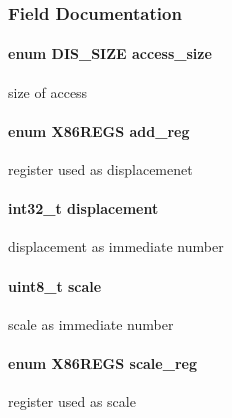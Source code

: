 \subsubsection{Field Documentation}
\hypertarget{struct_d_i_s__mem__arg_abe85ed51a3596cdb3a868a284c3d961f}{
\paragraph[{access\_\-size}]{\setlength{\rightskip}{0pt plus 5cm}enum {\bf DIS\_\-SIZE} {\bf access\_\-size}}\hfill}
\label{struct_d_i_s__mem__arg_abe85ed51a3596cdb3a868a284c3d961f}
size of access \hypertarget{struct_d_i_s__mem__arg_abdbd08c3d265ff494ad5ff1006cc6a73}{
\paragraph[{add\_\-reg}]{\setlength{\rightskip}{0pt plus 5cm}enum {\bf X86REGS} {\bf add\_\-reg}}\hfill}
\label{struct_d_i_s__mem__arg_abdbd08c3d265ff494ad5ff1006cc6a73}
register used as displacemenet \hypertarget{struct_d_i_s__mem__arg_a241d2c58aca95f8589148d4acf97406d}{
\paragraph[{displacement}]{\setlength{\rightskip}{0pt plus 5cm}int32\_\-t {\bf displacement}}\hfill}
\label{struct_d_i_s__mem__arg_a241d2c58aca95f8589148d4acf97406d}
displacement as immediate number \hypertarget{struct_d_i_s__mem__arg_a616c0a72f0e4af38b93c736773ac7210}{
\paragraph[{scale}]{\setlength{\rightskip}{0pt plus 5cm}uint8\_\-t {\bf scale}}\hfill}
\label{struct_d_i_s__mem__arg_a616c0a72f0e4af38b93c736773ac7210}
scale as immediate number \hypertarget{struct_d_i_s__mem__arg_afb3d2d6aee6f877fd62b8ffc576d9351}{
\paragraph[{scale\_\-reg}]{\setlength{\rightskip}{0pt plus 5cm}enum {\bf X86REGS} {\bf scale\_\-reg}}\hfill}
\label{struct_d_i_s__mem__arg_afb3d2d6aee6f877fd62b8ffc576d9351}
register used as scale 